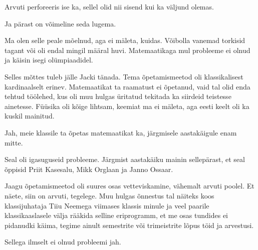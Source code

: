 
Arvuti perforeeris ise ka, sellel olid nii sisend kui ka väljund olemas.


Ja pärast on võimeline seda lugema. 


Ma olen selle peale mõelnud, aga ei mäleta, kuidas. Võibolla vanemad 
torkisid tagant või oli endal mingil määral huvi. Matemaatikaga mul probleeme 
ei olnud ja käisin isegi olümpiaadidel.


Selles mõttes tuleb jälle Jacki tänada. Tema õpetamismeetod 
oli klassikalisest kardinaalselt erinev. Matemaatikat 
ta raamatust ei õpetanud, vaid tal olid enda tehtud töölehed, kus oli 
muu hulgas üritatud tekitada ka siirdeid teistesse ainetesse. Füüsika oli 
kõige lihtsam, keemiat ma ei mäleta, aga eesti keelt oli ka
kuskil mainitud. 


Jah, meie klassile ta õpetas matemaatikat ka, järgmisele aastakäigule enam mitte. 


Seal oli igasuguseid probleeme. Järgmist aastakäiku mainin sellepärast, et 
seal õppisid Priit Kasesalu, Mikk 
Orglaan ja Janno 
Ossaar. 

Jaagu õpetamismeetod oli suures osas vetteviskamine, vähemalt 
arvuti poolel. Et näete, siin on arvuti, tegelege. Muu hulgas õnnestus tal 
näiteks koos klassijuhataja Tiiu Neemega viimases 
klassis minule ja veel paarile klassikaaslasele välja rääkida selline eriprogramm, et me osas 
tundides ei pidanudki käima, tegime ainult semestrite või trimeistrite 
lõpus töid ja arvestusi.


Sellega ilmselt ei olnud probleemi jah. 

